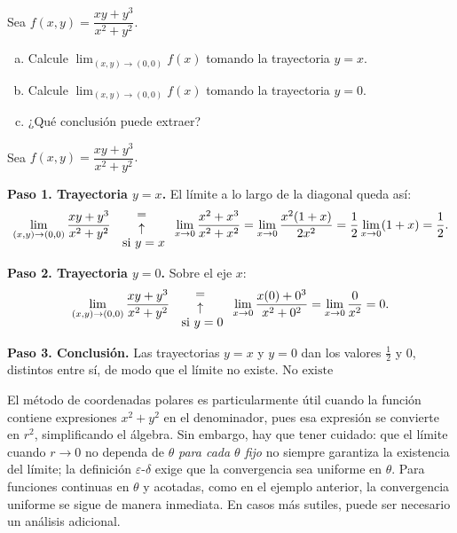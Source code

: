 \begin{prob}
Sea $f(x,y)=\dfrac{xy+y^3}{x^2+y^2}.$
\begin{enumerate}[(a)]
    \item Calcule $\displaystyle\lim_{(x,y)\to (0,0)}f(x)$ tomando la trayectoria $y=x.$
    \item Calcule $\displaystyle\lim_{(x,y)\to (0,0)}f(x)$ tomando la trayectoria $y=0.$
    \item ¿Qué conclusión puede extraer?
\end{enumerate}
\begin{myproof}
Sea $f(x,y)=\dfrac{xy+y^3}{x^2+y^2}.$

\textbf{Paso 1. Trayectoria $y=x$.} El límite a lo largo de la diagonal queda así:
\begin{align*}
\displaystyle\lim_{(x,y)\to (0,0)} \dfrac{xy+y^3}{x^2+y^2} {{=}\atop {\begin{array}{c}
\uparrow\\ \text{ si $y=x$}\end{array}} } \displaystyle\lim_{x\to 0}\dfrac{x^2+x^3}{x^2+x^2}=\displaystyle\lim_{x\to 0}\dfrac{x^2(1+x)}{2x^2}=\dfrac{1}{2}\lim_{x\to 0}(1+x)=\dfrac{1}{2}.
\end{align*}

\textbf{Paso 2. Trayectoria $y=0$.} Sobre el eje $x$:
\begin{align*}
\displaystyle\lim_{(x,y)\to (0,0)} \dfrac{xy+y^3}{x^2+y^2} {{=}\atop {\begin{array}{c}
\uparrow\\ \text{ si $y=0$}\end{array}} } \displaystyle\lim_{x\to 0}\dfrac{x(0)+0^3}{x^2+0^2}=\displaystyle\lim_{x\to 0}\dfrac{0}{x^2}=0.
\end{align*}

\textbf{Paso 3. Conclusión.} Las trayectorias $y=x$ y $y=0$ dan los valores $\tfrac{1}{2}$ y $0$, distintos entre sí, de modo que el límite no existe.
$\boxed{\text{No existe}}$
\end{myproof}
\end{prob}


\begin{rem}
El método de coordenadas polares es particularmente útil cuando la
función contiene expresiones $x^2+y^2$ en el denominador, pues esa
expresión se convierte en $r^2$, simplificando el álgebra. Sin
embargo, hay que tener cuidado: que el límite cuando $r\to 0$ no
dependa de $\theta$ \emph{para cada $\theta$ fijo} no siempre
garantiza la existencia del límite; la definición $\varepsilon$-$\delta$
exige que la convergencia sea uniforme en $\theta$. Para funciones
continuas en $\theta$ y acotadas, como en el ejemplo anterior, la
convergencia uniforme se sigue de manera inmediata. En casos más
sutiles, puede ser necesario un análisis adicional.
\end{rem}


